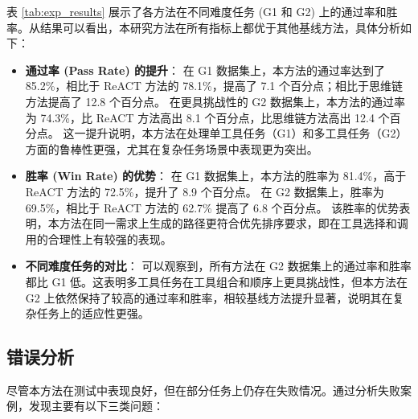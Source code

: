 表 \ref{tab:exp_results} 展示了各方法在不同难度任务 (G1 和 G2) 上的通过率和胜率。从结果可以看出，本研究方法在所有指标上都优于其他基线方法，具体分析如下：

\begin{itemize}
    \item \textbf{通过率 (Pass Rate) 的提升}：
    在 G1 数据集上，本方法的通过率达到了 85.2\%，相比于 ReACT 方法的 78.1\%，提高了 7.1 个百分点；相比于思维链方法提高了 12.8 个百分点。
    在更具挑战性的 G2 数据集上，本方法的通过率为 74.3\%，比 ReACT 方法高出 8.1 个百分点，比思维链方法高出 12.4 个百分点。
    这一提升说明，本方法在处理单工具任务（G1）和多工具任务（G2）方面的鲁棒性更强，尤其在复杂任务场景中表现更为突出。

    \item \textbf{胜率 (Win Rate) 的优势}：
    在 G1 数据集上，本方法的胜率为 81.4\%，高于 ReACT 方法的 72.5\%，提升了 8.9 个百分点。
    在 G2 数据集上，胜率为 69.5\%，相比于 ReACT 方法的 62.7\% 提高了 6.8 个百分点。
    该胜率的优势表明，本方法在同一需求上生成的路径更符合优先排序要求，即在工具选择和调用的合理性上有较强的表现。

    \item \textbf{不同难度任务的对比}：
    可以观察到，所有方法在 G2 数据集上的通过率和胜率都比 G1 低。这表明多工具任务在工具组合和顺序上更具挑战性，但本方法在 G2 上依然保持了较高的通过率和胜率，相较基线方法提升显著，说明其在复杂任务上的适应性更强。
\end{itemize}

\subsection{错误分析}
\label{subsec:error_analysis}

尽管本方法在测试中表现良好，但在部分任务上仍存在失败情况。通过分析失败案例，发现主要有以下三类问题：

